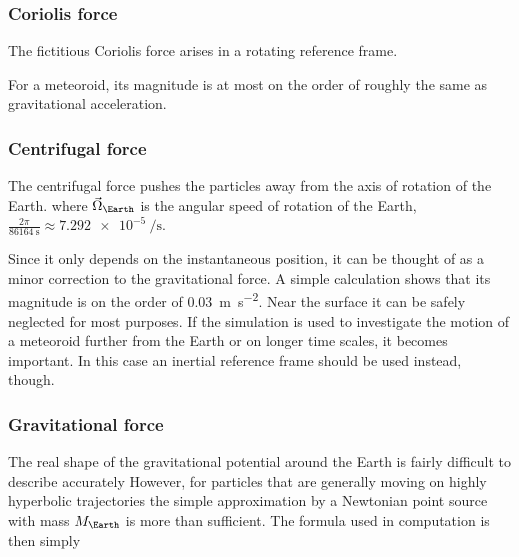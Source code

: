         \subsubsection{Coriolis force} \label{aafC}
            The fictitious Coriolis force arises in a rotating reference frame.

            For a meteoroid, its magnitude is at most on the order of
            roughly the same as gravitational acceleration.

        \subsubsection{Centrifugal force} \label{aafc}
            The centrifugal force pushes the particles away from the axis of rotation of the Earth.
            where $\vec{\Omega}_\Earth$ is the angular speed of rotation of the Earth,
            $\frac{2\pi}{\SI{86164}{\second}} \approx \SI{7.292e-5}{\per\second}$.

            Since it only depends on the instantaneous position, it can be thought of as a minor correction to the
            gravitational force. A simple calculation shows that its magnitude is on the order
            of \SI{0.03}{\metre\per\second\squared}. Near the surface it can be safely neglected for most purposes.
            If the simulation is used to investigate the motion of a meteoroid further from the Earth or
            on longer time scales, it becomes important.
            In this case an inertial reference frame should be used instead, though.

        \subsubsection{Gravitational force} \label{aafg}
            The real shape of the gravitational potential around the Earth is fairly difficult to describe accurately
            However, for particles that are generally moving on highly hyperbolic trajectories the
            simple approximation by a Newtonian point source with mass $M_\Earth$ is more than sufficient.
            The formula used in computation is then simply

